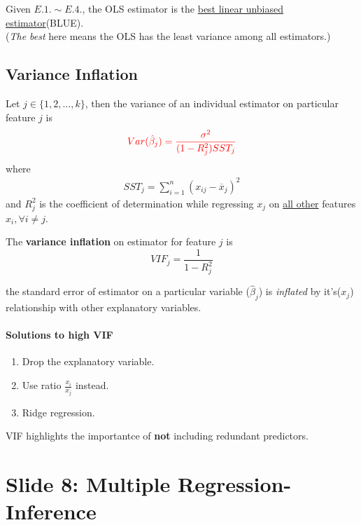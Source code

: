 \documentclass[]{article}
\begin{document}
    	\begin{theorem}
    		Given $E.1. \sim E.4.$, the OLS estimator is the \ul{best linear unbiased estimator}(BLUE). \\(\emph{The best} here means the OLS has the least variance among all estimators.)
    	\end{theorem}
    	
    	\subsection{Variance Inflation}
    	\par Let $j \in \{1, 2, \dots, k\}$, then the variance of an individual estimator on particular feature $j$ is 
    	\[\textcolor{red}{
    		Var(\hat{\beta}_j) = \frac{\sigma^2}{(1-R_j^2)SST_j}
    	}\]
    	where
    	\begin{gather*}
    		SST_j = \sum_{i=1}^n{(x_{ij} - \overline{x}_j)^2}
    	\end{gather*}
    	and $R_j^2$ is the coefficient of determination while regressing $x_j$ on \ul{all other} features $x_i, \forall i \neq j$.
    	\begin{definition}
    		The \textbf{variance inflation} on estimator for feature $j$ is 
    		\[
    			VIF_j = \frac{1}{1-R_j^2}
    		\]
    	\end{definition}
    	\begin{remark}[Interpretation] the standard error of estimator on a particular variable ($\hat{\beta}_j$) is \emph{inflated} by it's($x_j$) relationship with other explanatory variables.
    	\end{remark}	

    	\paragraph{Solutions to high VIF}
    		\begin{enumerate}
    			\item Drop the explanatory variable.
    			\item Use ratio $\frac{x_i}{x_j}$ instead.
    			\item Ridge regression.
    		\end{enumerate}
    	\begin{remark}
    		VIF highlights the importantce of \textbf{not} including redundant predictors.
    	\end{remark}
    	
    \section{Slide 8: Multiple Regression-Inference}
\end{document}
